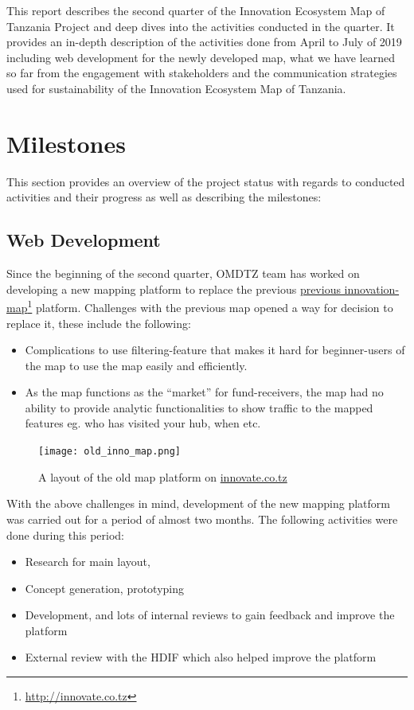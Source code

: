 \documentclass[a4paper,12pt,twoside]{article}
\begin{document}
This report describes the second quarter of the Innovation Ecosystem Map of Tanzania Project and deep dives into the activities conducted in the quarter. It provides an in-depth description of the activities done from April to July of 2019 including web development for the newly developed map, what we have learned so far from the engagement with stakeholders and the communication strategies used for sustainability of the Innovation Ecosystem Map of Tanzania.



\section{Milestones}
This section provides an overview of the project status with regards to conducted activities and their progress as well as describing the milestones:

\subsection{Web Development}
Since the beginning of the second quarter, OMDTZ team has worked on developing a new mapping platform to replace the previous \href{http://innovate.co.tz}{previous innovation-map}\footnote{\url{http://innovate.co.tz}} platform. Challenges with the previous map opened a way for decision to replace it, these include the following:

\begin{itemize}
    \item Complications to use filtering-feature that makes it hard for beginner-users of the map to use the map easily and efficiently.
    \item As the map functions as the “market” for fund-receivers, the map had no ability to provide analytic functionalities to show traffic to the mapped features eg. who has visited your hub, when etc.
\end{itemize}

\begin{figure}
    \centering
    \texttt{[image: old\_inno\_map.png]}
    \caption{A layout of the old map platform on \href{innovate.co.tz}{innovate.co.tz}}
\end{figure}

With the above challenges in mind, development of the new mapping platform was carried out for a period of almost two months. The following activities were done during this period:


\begin{itemize}
	\item Research for main layout,
	\item Concept generation, prototyping
	\item Development, and lots of internal reviews to gain feedback and improve the platform
	\item External review with the HDIF which also helped improve the platform
\end{itemize}
\end{document}
